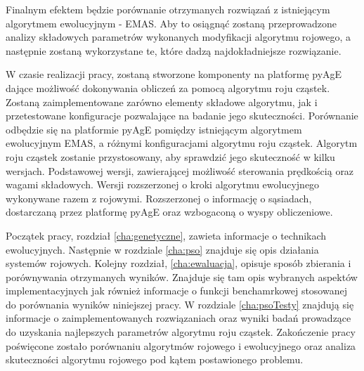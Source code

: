 Finalnym efektem będzie porównanie otrzymanych rozwiązań z istniejącym algorytmem ewolucyjnym - EMAS. Aby to osiągnąć zostaną przeprowadzone analizy składowych parametrów wykonanych modyfikacji algorytmu rojowego, a następnie zostaną wykorzystane te, które dadzą najdokładniejsze rozwiązanie.


W czasie realizacji pracy, zostaną stworzone komponenty na platformę pyAgE dające możliwość dokonywania obliczeń za pomocą algorytmu roju cząstek. Zostaną zaimplementowane zarówno elementy składowe algorytmu, jak i przetestowane konfiguracje pozwalające na badanie jego skuteczności.  Porównanie odbędzie się na platformie pyAgE pomiędzy istniejącym algorytmem ewolucyjnym EMAS, a różnymi konfiguracjami algorytmu roju cząstek. Algorytm roju cząstek zostanie przystosowany, aby sprawdzić jego skuteczność w kilku wersjach. Podstawowej wersji, zawierającej możliwość sterowania prędkością oraz wagami składowych. Wersji rozszerzonej o kroki algorytmu ewolucyjnego wykonywane razem z rojowymi. Rozszerzonej o informację o sąsiadach, dostarczaną przez platformę pyAgE oraz wzbogaconą o wyspy obliczeniowe.

Początek pracy, rozdział \ref{cha:genetyczne}, zawieta informacje o technikach ewolucyjnych. Następnie w rozdziale \ref{cha:pso} znajduje się opis działania systemów rojowych. Kolejny rozdział, \ref{cha:ewaluacja}, opisuje sposób zbierania i porównywania otrzymanych wyników. Znajduje się tam opis wybranych aspektów implementacyjnych jak również informacje o funkcji benchamrkowej stosowanej do porównania wyników niniejszej pracy. W rozdziale \ref{cha:psoTesty} znajdują się informacje o zaimplementowanych rozwiązaniach oraz wyniki badań prowadzące do uzyskania najlepszych parametrów algorytmu roju cząstek. Zakończenie pracy poświęcone zostało porównaniu algorytmów rojowego i ewolucyjnego oraz analiza skuteczności algorytmu rojowego pod kątem postawionego problemu.



